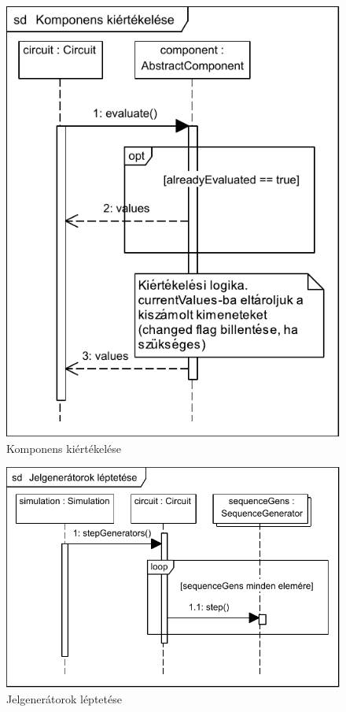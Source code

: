 \begin{figure}[H]
\begin{center}
\includegraphics{chapters/chapter04/seqdiagrams/komponensek_kiertekelese.pdf}
\caption{Komponens kiértékelése}
\label{fig:component_sim}
\end{center}
\end{figure}

\begin{figure}[H]
\begin{center}
\includegraphics{chapters/chapter04/seqdiagrams/jelgeneratorok_leptetese.pdf}
\caption{Jelgenerátorok léptetése}
\label{fig:step_gens}
\end{center}
\end{figure}

